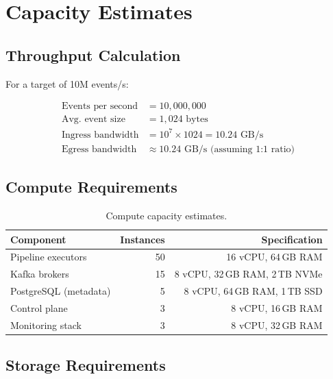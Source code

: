 \documentclass[
    language=english,
    doctype=technical-report,
    institution=none,
    titlestyle=book,
    oneside,
]{../../omnilatex}
\begin{document}
\chapter{Capacity Estimates}
\label{sec:capacity}

\section{Throughput Calculation}

For a target of 10M events/s:

\begin{align}
    \text{Events per second} &= 10{,}000{,}000 \\
    \text{Avg.\ event size} &= 1{,}024\text{ bytes} \\
    \text{Ingress bandwidth} &= 10^7 \times 1024 = 10.24\text{ GB/s} \\
    \text{Egress bandwidth} &\approx 10.24\text{ GB/s (assuming 1:1 ratio)}
\end{align}

\section{Compute Requirements}

\begin{table}[htbp]
    \centering
    \caption{Compute capacity estimates.}
    \label{tab:compute}
    \begin{tabular}{@{}lrr@{}}
        \toprule
        Component & Instances & Specification \\
        \midrule
        Pipeline executors & 50 & 16 vCPU, 64\,GB RAM \\
        Kafka brokers & 15 & 8 vCPU, 32\,GB RAM, 2\,TB NVMe \\
        PostgreSQL (metadata) & 5 & 8 vCPU, 64\,GB RAM, 1\,TB SSD \\
        Control plane & 3 & 8 vCPU, 16\,GB RAM \\
        Monitoring stack & 3 & 8 vCPU, 32\,GB RAM \\
        \bottomrule
    \end{tabular}
\end{table}

\section{Storage Requirements}
\end{document}
